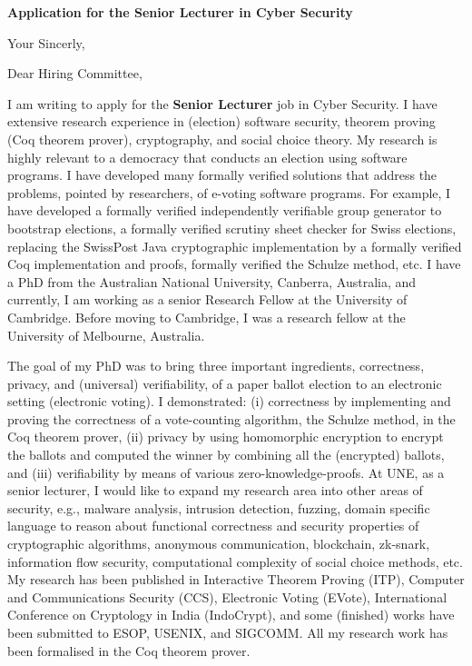\documentclass[11pt,a4paper,roman]{moderncv}
\begin{document}
\date{}
\opening{\textbf{Application for the Senior Lecturer in Cyber Security}}
\closing{Your Sincerly, \vspace{-1em}}



\makelettertitle

Dear Hiring Committee, 

I am writing to apply
for the \textbf{Senior Lecturer} job in Cyber Security. 
I have extensive research experience in
(election) software security, theorem proving (Coq theorem prover), cryptography,  
and social choice theory. My research is highly relevant to a democracy that conducts 
an election using software programs. I have developed many formally verified 
solutions that address the problems, pointed by researchers, 
of e-voting software programs. 
For example, I have developed a formally verified independently 
verifiable group generator to bootstrap elections, a formally verified 
scrutiny sheet checker for Swiss elections, replacing the SwissPost Java 
cryptographic implementation by a formally verified Coq implementation and proofs,  
formally verified the Schulze method, etc.
I have a PhD from the Australian National University, Canberra, Australia,
and currently, I am working as a senior Research Fellow at the University of 
Cambridge. Before moving to Cambridge, I was a 
research fellow at the University of Melbourne, Australia.



The goal of my PhD was to 
bring  three important ingredients, correctness, privacy, and (universal) verifiability, of a 
paper ballot election to an electronic setting (electronic voting). I 
demonstrated: (i) correctness by implementing and proving the correctness of 
a vote-counting algorithm, the Schulze method, in the Coq theorem prover, 
(ii) privacy by using homomorphic encryption to encrypt the ballots and computed
the winner by combining all the (encrypted) ballots, and 
(iii) verifiability by means of various zero-knowledge-proofs.
At UNE, as a senior lecturer, 
I would like to expand my research area into other areas of 
security, e.g., malware analysis, intrusion detection,
fuzzing, domain specific language to reason about 
functional correctness and security properties of 
cryptographic algorithms, anonymous communication, blockchain, zk-snark,  
information flow security, computational complexity of social choice methods, 
etc. My research has been published in Interactive Theorem Proving (ITP), 
Computer and Communications Security (CCS), Electronic Voting (EVote), 
International Conference on Cryptology in India (IndoCrypt),
and some (finished) works have been submitted to ESOP, USENIX, and SIGCOMM. 
All my research work has been formalised in the Coq theorem prover. 
\end{document}
